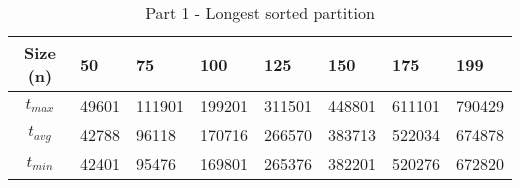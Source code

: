 \usepackage{array}

\begin{table}[h!]
\begin{center}
\begin{tabular}{|c|m{0.80cm}|m{0.80cm}|m{0.80cm}|m{0.80cm}|m{0.80cm}|m{0.80cm}|m{1cm}|} 
 \hline
 Size (n) & 50 & 75 & 100 & 125 & 150 & 175 & 199 \\
 \hline\hline
 $t_{max}$ & 49601 & 111901 & 199201 & 311501 & 448801 & 611101 & 790429 \\
 \hline
 $t_{avg}$ & 42788 & 96118 & 170716 & 266570 & 383713 & 522034 & 674878 \\
 \hline
 $t_{min}$ & 42401 & 95476 & 169801 & 265376 & 382201 & 520276 & 672820 \\
 \hline
\end{tabular}
\label{partition_table}
\caption{Part 1 - Longest sorted partition}
\end{center}
\end{table}
